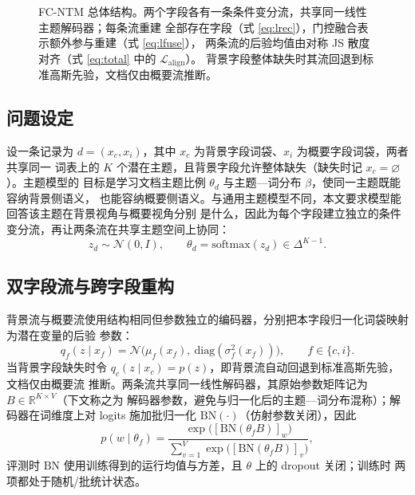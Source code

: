 \documentclass[11pt]{ctexart}
\newcommand{\fcntm}{FC-NTM}
\begin{document}
\begin{figure}[t]
\caption{\fcntm{} 总体结构。两个字段各有一条条件变分流，共享同一线性主题解码器；每条流重建
全部存在字段（式 \eqref{eq:lrec}），门控融合表示额外参与重建（式 \eqref{eq:lfuse}），
两条流的后验均值由对称 JS 散度对齐（式 \eqref{eq:total} 中的 $\mathcal{L}_{\mathrm{align}}$）。
背景字段整体缺失时其流回退到标准高斯先验，文档仅由概要流推断。}
\label{fig:arch}
\end{figure}

\subsection{问题设定}

设一条记录为 $d=(x_c,x_i)$，其中 $x_c$ 为背景字段词袋、$x_i$ 为概要字段词袋，两者共享同一
词表上的 $K$ 个潜在主题，且背景字段允许整体缺失（缺失时记 $x_c=\varnothing$）。主题模型的
目标是学习文档主题比例 $\theta_d$ 与主题—词分布 $\beta$，使同一主题既能容纳背景侧语义，
也能容纳概要侧语义。与通用主题模型不同，本文要求模型能回答该主题在背景视角与概要视角分别
是什么，因此为每个字段建立独立的条件变分流，再让两条流在共享主题空间上协同：
\begin{equation}
z_d\sim\mathcal{N}(0,I),\qquad \theta_d=\mathrm{softmax}(z_d)\in\Delta^{K-1}.
\end{equation}

\subsection{双字段流与跨字段重构}

背景流与概要流使用结构相同但参数独立的编码器，分别把本字段归一化词袋映射为潜在变量的后验
参数：
\begin{equation}
q_f(z\mid x_f)=\mathcal{N}\big(\mu_f(x_f),\ \mathrm{diag}(\sigma_f^2(x_f))\big),
\qquad f\in\{c,i\}.
\end{equation}
当背景字段缺失时令 $q_c(z\mid x_c)=p(z)$，即背景流自动回退到标准高斯先验，文档仅由概要流
推断。两条流共享同一线性解码器，其原始参数矩阵记为 $B\in\mathbb{R}^{K\times V}$（下文称之为
解码器参数，避免与归一化后的主题—词分布混称）；解码器在词维度上对 logits 施加批归一化
$\mathrm{BN}(\cdot)$（仿射参数关闭），因此
\begin{equation}
p(w\mid \theta_f)=\frac{\exp\big([\mathrm{BN}(\theta_f B)]_w\big)}
{\sum_{v=1}^{V}\exp\big([\mathrm{BN}(\theta_f B)]_v\big)} ,
\label{eq:decode}
\end{equation}
评测时 $\mathrm{BN}$ 使用训练得到的运行均值与方差，且 $\theta$ 上的 dropout 关闭；训练时
两项都处于随机/批统计状态。
\end{document}

